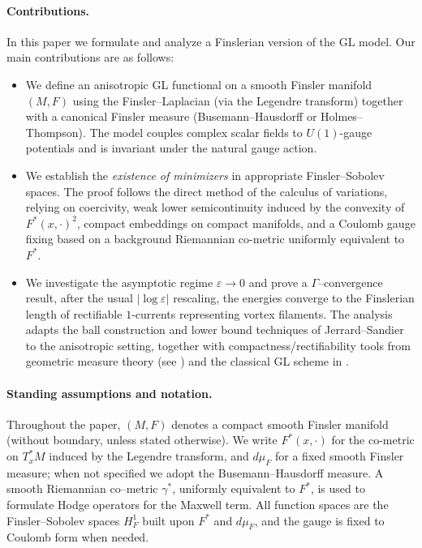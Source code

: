 \documentclass[fleqn,11pt,twoside]{article}
\theoremstyle{definition}
\begin{document}
\paragraph{Contributions.}
In this paper we formulate and analyze a Finslerian version of the GL model. Our main
contributions are as follows:
\begin{itemize}
\item[(i)] 
We define an anisotropic GL functional on a smooth Finsler manifold $(M,F)$ using the Finsler--Laplacian (via the Legendre transform) together with a canonical Finsler measure (Busemann--Hausdorff or Holmes--Thompson). The model couples complex scalar fields to $U(1)$-gauge potentials and is invariant under the natural gauge action.

\item[(ii)] 
We establish the \emph{existence of minimizers} in appropriate
Finsler--Sobolev spaces. The proof follows the direct method of the calculus of variations, relying on coercivity, weak lower semicontinuity induced by the convexity of $F^*(x,\cdot)^2$, compact embeddings on compact manifolds, and a Coulomb gauge
fixing based on a background Riemannian co-metric uniformly equivalent to $F^*$.

\item[(iii)] 
We investigate the asymptotic regime $\varepsilon\to 0$ and prove a $\Gamma$--convergence result, after the usual $|\log\varepsilon|$ rescaling, the energies converge to the Finslerian length of rectifiable $1$-currents representing
vortex filaments. The analysis adapts the ball construction and lower bound techniques of Jerrard--Sandier \cite{JerrardSandier2000} to the anisotropic setting, together
with compactness/rectifiability tools from geometric measure theory (see \cite{FedererFleming1960}) and the classical GL scheme in \cite{BBH1994,SandierSerfaty2007}.
\end{itemize}

\paragraph{Standing assumptions and notation.}

Throughout the paper, $(M,F)$ denotes a compact smooth Finsler manifold (without boundary, unless stated otherwise). We write $F^*(x,\cdot)$ for the co-metric on $T_x^*M$ induced by
the Legendre transform, and $d\mu_F$ for a fixed smooth Finsler measure; when not specified we adopt the Busemann--Hausdorff measure. A smooth Riemannian co--metric $\gamma^*$, uniformly equivalent to $F^*$, is used to formulate Hodge operators for the Maxwell term. All function spaces are the Finsler--Sobolev spaces $H^1_F$ built upon $F^*$ and $d\mu_F$, and the gauge is fixed to Coulomb form when needed.
\end{document}
